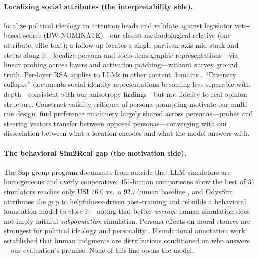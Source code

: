 \paragraph{Localizing social attributes (the interpretability side).}
\citet{kimevans2025} localize political ideology to attention heads and
validate against legislator vote-based scores (DW-NOMINATE)---our closest
methodological relative (one attribute, elite text); a follow-up locates a
single partisan axis mid-stack and steers along it
\citep{partisandir2026}.
\citet{personalocal2025,sociodemo2025,personapatch2025} localize persona
and socio-demographic representations---via linear probing across layers
and activation patching---without survey ground truth.
Per-layer RSA applies to LLMs in other content
domains \citep{assoc2026}. ``Diversity collapse'' \citep{divcollapse2026}
documents social-identity representations becoming less separable with
depth---consistent with our anisotropy findings---but not fidelity to real
opinion structure. Construct-validity critiques of
persona prompting \citep{constructvalidity2026} motivate our multi-cue
design. \citet{personaprefs2026} find preference machinery largely shared
across personas---probes and steering vectors transfer between opposed
personas---converging with our dissociation between what a location
encodes and what the model answers with.

\paragraph{The behavioral Sim2Real gap (the motivation side).}
The Sap-group program documents from outside that LLM simulators are
homogeneous and overly cooperative: 451-human comparisons show the best of
31 simulators reaches only USI 76.0 vs.\ a 92.7 human baseline
\citep{sim2real2026}, and OdysSim \citep{odyssim2026} attributes the gap
to helpfulness-driven post-training and rebuilds a behavioral foundation
model to close it---noting that better \emph{average}
human simulation does not imply faithful \emph{subpopulation} simulation.
Persona effects on moral stances are strongest for political ideology and
personality \citep{socratic2025}. Foundational annotation work
\citep{socialchem2020,annotators2022} established that human judgments are
distributions conditioned on who answers---our evaluation's premise.
None of this line opens the model.
